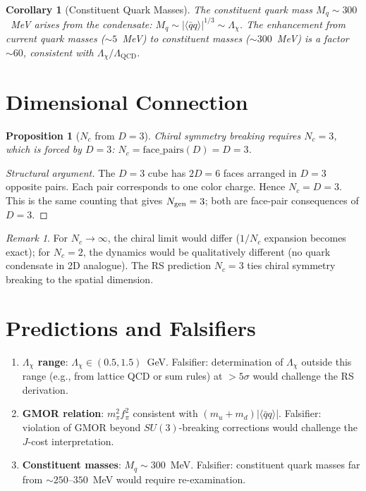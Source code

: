 \documentclass[12pt,a4paper]{article}
\newtheorem{corollary}[theorem]{Corollary}
\newtheorem{proposition}[theorem]{Proposition}
\theoremstyle{definition}
\theoremstyle{remark}
\newtheorem{remark}[theorem]{Remark}
\begin{document}
\begin{corollary}[Constituent Quark Masses]
\label{cor:constituent}
The constituent quark mass $M_q \sim 300$~MeV arises from the
condensate: $M_q \sim |\langle\bar{q}q\rangle|^{1/3} \sim
\Lambda_\chi$.  The enhancement from current quark masses
($\sim 5$~MeV) to constituent masses ($\sim 300$~MeV) is a factor
$\sim 60$, consistent with $\Lambda_\chi/\Lambda_{\mathrm{QCD}}$.
\end{corollary}

\section{Dimensional Connection}
\label{sec:dimension}

\begin{proposition}[$N_c$ from $D = 3$]
\label{thm:nc}
Chiral symmetry breaking requires $N_c = 3$, which is forced by
$D = 3$: $N_c = \mathrm{face\_pairs}(D) = D = 3$.
\end{proposition}

\begin{proof}[Structural argument]
The $D=3$ cube has $2D=6$ faces arranged in $D=3$ opposite pairs.
Each pair corresponds to one color charge.  Hence $N_c = D = 3$.
This is the same counting that gives $N_{\rm gen}=3$; both are face-pair
consequences of $D=3$.
\end{proof}

\begin{remark}
For $N_c \to \infty$, the chiral limit would differ ($1/N_c$ expansion
becomes exact); for $N_c = 2$, the dynamics would be qualitatively
different (no quark condensate in 2D analogue).  The RS prediction
$N_c = 3$ ties chiral symmetry breaking to the spatial dimension.
\end{remark}

\section{Predictions and Falsifiers}
\label{sec:predictions}

\begin{enumerate}[label=(\roman*)]
\item \textbf{$\Lambda_\chi$ range}: $\Lambda_\chi \in (0.5,
1.5)$~GeV.  Falsifier: determination of $\Lambda_\chi$ outside this
range (e.g., from lattice QCD or sum rules) at $> 5\sigma$ would
challenge the RS derivation.

\item \textbf{GMOR relation}: $m_\pi^2 f_\pi^2$ consistent with
$(m_u + m_d)|\langle\bar{q}q\rangle|$.  Falsifier: violation of
GMOR beyond $SU(3)$-breaking corrections would challenge the
$J$-cost interpretation.

\item \textbf{Constituent masses}: $M_q \sim 300$~MeV.  Falsifier:
constituent quark masses far from $\sim 250$--$350$~MeV would
require re-examination.
\end{enumerate}
\end{document}
